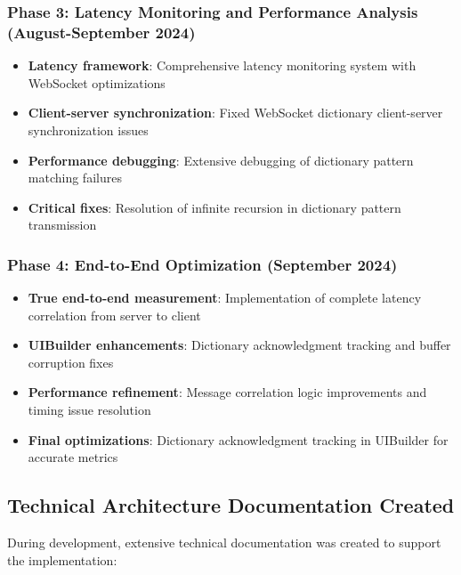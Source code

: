 \documentclass[12pt,a4paper]{article}
\begin{document}
\subsubsection{Phase 3: Latency Monitoring and Performance Analysis (August-September 2024)}
\begin{itemize}
    \item \textbf{Latency framework}: Comprehensive latency monitoring system with WebSocket optimizations
    \item \textbf{Client-server synchronization}: Fixed WebSocket dictionary client-server synchronization issues
    \item \textbf{Performance debugging}: Extensive debugging of dictionary pattern matching failures
    \item \textbf{Critical fixes}: Resolution of infinite recursion in dictionary pattern transmission
\end{itemize}

\subsubsection{Phase 4: End-to-End Optimization (September 2024)}
\begin{itemize}
    \item \textbf{True end-to-end measurement}: Implementation of complete latency correlation from server to client
    \item \textbf{UIBuilder enhancements}: Dictionary acknowledgment tracking and buffer corruption fixes
    \item \textbf{Performance refinement}: Message correlation logic improvements and timing issue resolution
    \item \textbf{Final optimizations}: Dictionary acknowledgment tracking in UIBuilder for accurate metrics
\end{itemize}

\subsection{Technical Architecture Documentation Created}

During development, extensive technical documentation was created to support the implementation:
\end{document}
